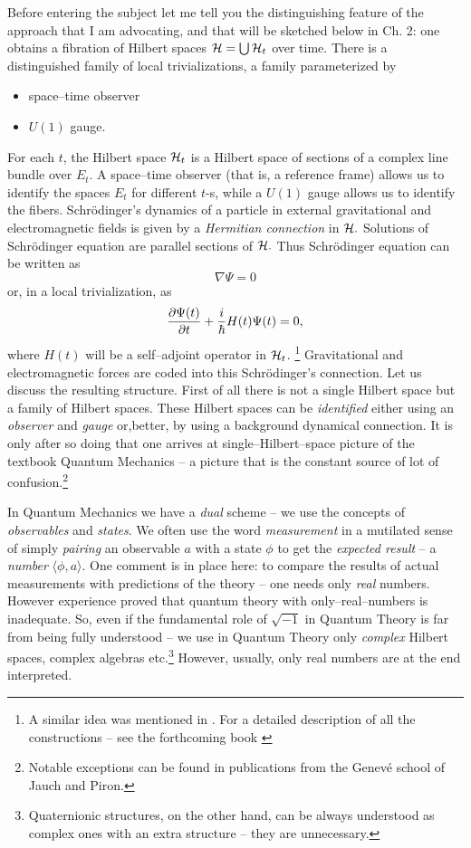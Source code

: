 \documentclass[12pt]{article}
\def\be{\begin{equation}} \def\ee{\end{equation}}
\begin{document}
Before entering the subject let me tell you the
distinguishing feature of the approach that I am advocating,  and that
will be sketched below in Ch. 
2:  one obtains a fibration of Hilbert spaces ${\cal H}=\bigcup {\cal H}
_t$ over time.  There is  a distinguished family of local
trivializations,  a family parameterized by 
\begin{itemize}
\item  space--time observer 
\item $U (1)$ gauge.
\end{itemize}
For each $t$, the Hilbert space ${\cal H}_t$ is a Hilbert space
of sections of a complex line bundle over $E_t$. A space--time observer
(that is, a reference frame)
allows us to identify the spaces $E_t$ for different $t$-s, while
a $U(1)$ gauge allows us to identify the fibers.
Schr\"odinger's dynamics of a particle in external gravitational and
electromagnetic
fields
is given by a {\sl Hermitian connection} in ${\cal H}. $ Solutions of
Schr\"odinger
equation are parallel sections of ${\cal H}. $ Thus Schr\"odinger equation
can be written
as \be
\nabla \Psi = 0 \ee
or,  in a local trivialization,  as \be
{\frac{{\partial \Psi  (t)}}{{\partial t}}} + 
{i\over\hbar}H (t)\Psi  (t) =
0,  \ee
where $H (t)$ will be a self--adjoint operator in ${\cal H}_t$.%
\footnote{A similar idea was mentioned in \cite{aso}.  For a detailed
description of all the constructions -- see the forthcoming book \cite{jamo}}
Gravitational and electromagnetic forces are
coded into this Schr\"odinger's connection. 
Let us discuss the resulting structure.  First of all
there is not a single  Hilbert space but a
{family} of Hilbert spaces. 
These Hilbert spaces can be {\sl identified} either using an
{\sl observer}  and
{\sl gauge}  or,better, by using a background dynamical connection.
It is only after so doing 
that one arrives at
single--Hilbert--space picture of the textbook Quantum Mechanics --
a picture that
is the constant source of lot of confusion.\footnote{Notable
exceptions can be found in  publications from the
Genev\'e school of Jauch and Piron. }
 
In Quantum Mechanics we have a {\sl dual}
scheme -- we use the concepts of {\sl observables} and {\sl states}.  We often
use the word {\sl measurement} in a mutilated sense of simply {\sl pairing}
an observable $a$ with a state $\phi $ to get the {\sl expected result} -- 
a {\sl number} $
\langle\phi , a\rangle. $ 
\noindent
One comment is in place here:  to compare the results of actual
measurements with predictions of the theory -- one needs only {\sl real}
numbers.  However experience proved that quantum theory with
only--real--numbers is inadequate.  So,  even if the fundamental role of
$\sqrt{-1}$ in Quantum Theory is far from being fully understood --
we use in Quantum Theory only {\sl complex} Hilbert spaces,  complex algebras
etc.\footnote{Quaternionic  structures,  on the other hand,  can be always 
understood as complex
ones with an extra structure -- they are unnecessary.  } 
However,  usually,  only real numbers are at the end interpreted.  
 
\end{document}
